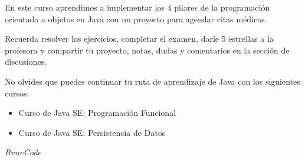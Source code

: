 \documentclass{article}
\begin{document}
En este curso aprendimos a implementar los 4 pilares de la programación
orientada a objetos en Java con un proyecto para agendar citas médicas.

Recuerda resolver los ejercicios, completar el examen, darle 5 estrellas a la
profesora y compartir tu proyecto, notas, dudas y comentarios en la sección de
discusiones.

No olvides que puedes continuar tu ruta de aprendizaje de Java con los
siguientes cursos:

\begin{itemize}
  \item Curso de Java SE: Programación Funcional
  \item Curso de Java SE: Persistencia de Datos
\end{itemize}



































\vspace{2cm}
\LARGE\textit{RuneCode}
\end{document}
